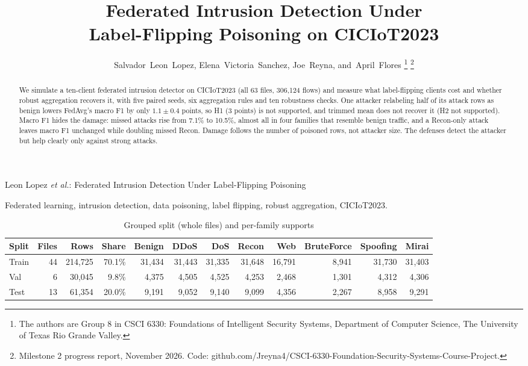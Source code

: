 \documentclass[journal]{IEEEtran}
\begin{document}
\title{Federated Intrusion Detection Under\\ Label-Flipping Poisoning on CICIoT2023}

\author{Salvador~Leon~Lopez, Elena~Victoria~Sanchez, Joe~Reyna, and~April~Flores%
\thanks{The authors are Group 8 in CSCI 6330: Foundations of Intelligent Security Systems, Department of Computer Science, The University of Texas Rio Grande Valley.}%
\thanks{Milestone 2 progress report, November 2026. Code: github.com/Jreyna4/CSCI-6330-Foundation-Security-Systems-Course-Project.}}

%
{Leon Lopez \MakeLowercase{\textit{et al.}}: Federated Intrusion Detection Under Label-Flipping Poisoning}

\maketitle

\begin{abstract}
We simulate a ten-client federated intrusion detector on CICIoT2023 (all 63 files, 306,124 flows) and measure what label-flipping clients cost and whether robust aggregation recovers it, with five paired seeds, six aggregation rules and ten robustness checks. One attacker relabeling half of its attack rows as benign lowers FedAvg's macro F1 by only $1.1\pm0.4$ points, so H1 (3 points) is not supported, and trimmed mean does not recover it (H2 not supported). Macro F1 hides the damage: missed attacks rise from 7.1\% to 10.5\%, almost all in four families that resemble benign traffic, and a Recon-only attack leaves macro F1 unchanged while doubling missed Recon. Damage follows the number of poisoned rows, not attacker size. The defenses detect the attacker but help clearly only against strong attacks.
\end{abstract}

\begin{IEEEkeywords}
Federated learning, intrusion detection, data poisoning, label flipping, robust aggregation, CICIoT2023.
\end{IEEEkeywords}

\begin{table}[t]
\caption{Grouped split (whole files) and per-family supports}
\label{tab:split}
\centering\footnotesize
\setlength{\tabcolsep}{6pt}
\begin{tabular}{@{}lrrrrrrrrrrr@{}}
\toprule
Split & Files & Rows & Share & Benign & DDoS & DoS & Recon & Web & BruteForce & Spoofing & Mirai \\
\midrule
Train & 44 & 214,725 & 70.1\% & 31,434 & 31,443 & 31,335 & 31,648 & 16,791 & 8,941 & 31,730 & 31,403 \\
Val & 6 & 30,045 & 9.8\% & 4,375 & 4,505 & 4,525 & 4,253 & 2,468 & 1,301 & 4,312 & 4,306 \\
Test & 13 & 61,354 & 20.0\% & 9,191 & 9,052 & 9,140 & 9,099 & 4,356 & 2,267 & 8,958 & 9,291 \\
\bottomrule
\end{tabular}
\end{table}
\end{document}
